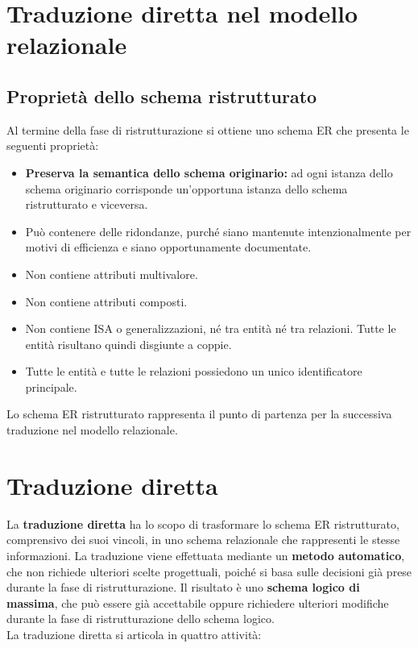 \section{Traduzione diretta nel modello relazionale}
\subsection{Proprietà dello schema ristrutturato}

Al termine della fase di ristrutturazione si ottiene
uno schema ER che presenta le seguenti proprietà:

\begin{itemize}
    \item \textbf{Preserva la semantica dello schema
    originario:} ad ogni istanza dello schema
    originario corrisponde un'opportuna istanza
    dello schema ristrutturato e viceversa.

    \item Può contenere delle ridondanze, purché
    siano mantenute intenzionalmente per motivi
    di efficienza e siano opportunamente documentate.

    \item Non contiene attributi multivalore.

    \item Non contiene attributi composti.

    \item Non contiene ISA o generalizzazioni,
    né tra entità né tra relazioni.
    Tutte le entità risultano quindi disgiunte
    a coppie.

    \item Tutte le entità e tutte le relazioni
    possiedono un unico identificatore principale.
\end{itemize}

\noindent
Lo schema ER ristrutturato rappresenta il punto
di partenza per la successiva traduzione nel
modello relazionale.


\section{Traduzione diretta}

La \textbf{traduzione diretta} ha lo scopo di
trasformare lo schema ER ristrutturato, comprensivo
dei suoi vincoli, in uno schema relazionale
che rappresenti le stesse informazioni.
La traduzione viene effettuata mediante un
\textbf{metodo automatico}, che non richiede
ulteriori scelte progettuali, poiché si basa
sulle decisioni già prese durante la fase
di ristrutturazione.
Il risultato è uno \textbf{schema logico di massima},
che può essere già accettabile oppure richiedere
ulteriori modifiche durante la fase di
ristrutturazione dello schema logico.\medskip\\
\noindent
La traduzione diretta si articola in quattro
attività:

